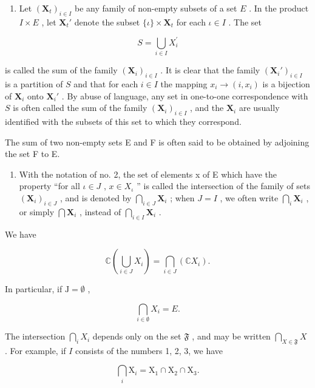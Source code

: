 \begin{enumerate}
\def\labelenumi{\arabic{enumi}.}
\setcounter{enumi}{4}
\tightlist
\item
  Let \((\mathbf{X}_t)_{i \in I}\) be any family of non-empty subsets of a set \(E\) . In the product \(I \times E\) , let \(\mathbf{X}_t'\) denote the subset \(\{\iota\} \times \mathbf{X}_t\) for each \(\iota \in I\) . The set
\end{enumerate}

\[
S = \bigcup_ {i \in I} X _ {i} ^ {\prime}
\]

is called the sum of the family \((\mathbf{X}_i)_{i\in I}\) . It is clear that the family \((\mathbf{X}_i')_{i\in I}\) is a partition of \(S\) and that for each \(i\in I\) the mapping \(x_i\to (i,x_i)\) is a bijection of \(\mathbf{X}_i\) onto \(\mathbf{X}_i'\) . By abuse of language, any set in one-to-one correspondence with \(S\) is often called the sum of the family \((\mathbf{X}_i)_{i\in I}\) , and the \(\mathbf{X}_i\) are usually identified with the subsets of this set to which they correspond.

The sum of two non-empty sets E and F is often said to be obtained by adjoining the set F to E.

\begin{enumerate}
\def\labelenumi{\arabic{enumi}.}
\setcounter{enumi}{5}
\tightlist
\item
  With the notation of no. 2, the set of elements x of E which have the property ``for all \(\iota\in J\) , \(x\in X_{\iota}\) '' is called the intersection of the family of sets \((\mathbf{X}_i)_{i \in J}\) , and is denoted by \(\bigcap_{i \in J} \mathbf{X}_i\) ; when \(J = I\) , we often write \(\bigcap_{i} \mathbf{X}_i\) , or simply \(\bigcap \mathbf{X}_i\) , instead of \(\bigcap_{i \in I} \mathbf{X}_i\) .
\end{enumerate}

We have

\[
\mathbb {C} \left(\bigcup_ {i \in J} X _ {i}\right) = \bigcap_ {i \in J} \left(\mathbb {C} X _ {i}\right).\tag{39}
\]

In particular, if \(\mathrm{J} = \emptyset\) ,

\[
\bigcap_ {i \in \emptyset} X _ {i} = E.\tag{40}
\]

The intersection \(\bigcap_{i} X_i\) depends only on the set \(\mathfrak{F}\) , and may be written \(\bigcap_{X \in \mathfrak{F}} X\) . For example, if \(I\) consists of the numbers 1, 2, 3, we have

\[
\bigcap_ {i} \mathrm{X} _ {i} = \mathrm{X} _ {1} \cap \mathrm{X} _ {2} \cap \mathrm{X} _ {3}.
\]

